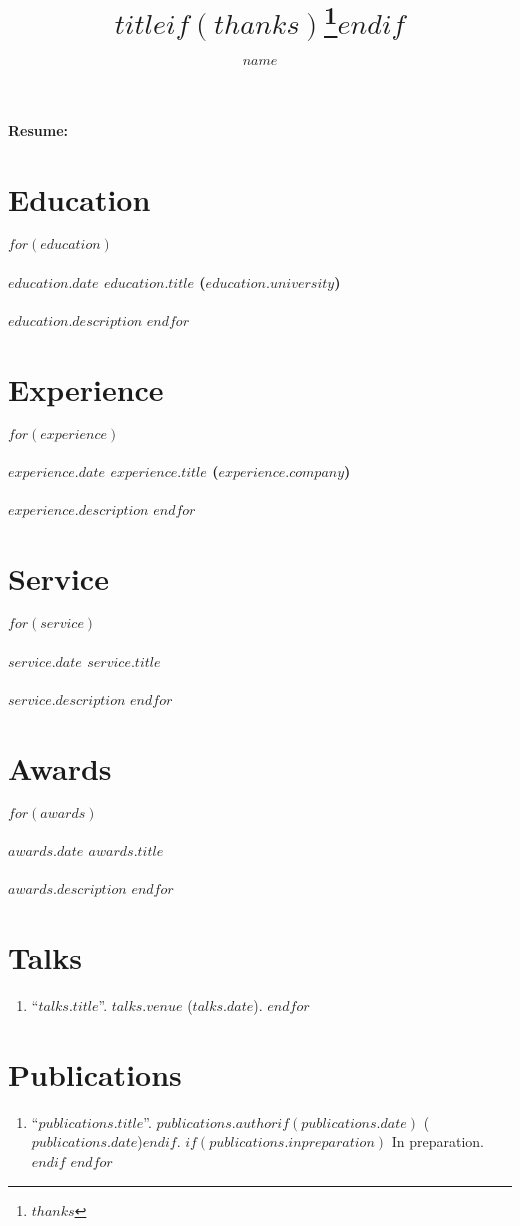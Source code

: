 \documentclass[10pt,twocolumn]{article}
\title{$title$$if(thanks)$\thanks{$thanks$}$endif$}
\author{$name$}
\date{}
\makeatletter
\renewcommand\maketitle{
    {\raggedright\begin{center}%
      {\Large\bfseries Resume: \@author}\\[4ex]
    \end{center}}
  }
\makeatother
\begin{document}
\maketitle
\thispagestyle{empty}

\section*{Education}
$for(education)$
\paragraph{$education.date$ $education.title$ ($education.university$)}
$education.description$
$endfor$

\section*{Experience}
$for(experience)$
\paragraph{$experience.date$ $experience.title$ ($experience.company$)}
$experience.description$
$endfor$

\section*{Service}
$for(service)$
\paragraph{$service.date$ $service.title$}
$service.description$
$endfor$

\section*{Awards}
$for(awards)$
\paragraph{$awards.date$ $awards.title$}
$awards.description$
$endfor$

\section*{Talks}
\begin{enumerate}
$for(talks)$
\item ``\href{$talks.link$}{$talks.title$}''. $talks.venue$ ($talks.date$).
$endfor$
\end{enumerate}

\section*{Publications}
\begin{enumerate}
$for(publications)$
\item ``\href{$publications.link$}{$publications.title$}''. $publications.author$$if(publications.date)$ ($publications.date$)$endif$.
$if(publications.inpreparation)$
In preparation.
$endif$
$endfor$
\end{enumerate}
\end{document}
